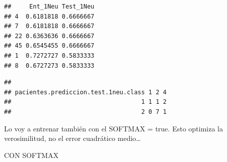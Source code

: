 \documentclass[]{article}
\newenvironment{Shaded}{\begin{snugshade}}{\end{snugshade}}
\newcommand{\CommentTok}[1]{\textcolor[rgb]{0.56,0.35,0.01}{\textit{#1}}}
\newcommand{\DataTypeTok}[1]{\textcolor[rgb]{0.13,0.29,0.53}{#1}}
\newcommand{\FloatTok}[1]{\textcolor[rgb]{0.00,0.00,0.81}{#1}}
\newcommand{\KeywordTok}[1]{\textcolor[rgb]{0.13,0.29,0.53}{\textbf{#1}}}
\newcommand{\NormalTok}[1]{#1}
\newcommand{\OperatorTok}[1]{\textcolor[rgb]{0.81,0.36,0.00}{\textbf{#1}}}
\newcommand{\StringTok}[1]{\textcolor[rgb]{0.31,0.60,0.02}{#1}}
\begin{document}
\begin{Shaded}
\end{Shaded}

\begin{verbatim}
##     Ent_1Neu Test_1Neu
## 4  0.6181818 0.6666667
## 7  0.6181818 0.6666667
## 22 0.6363636 0.6666667
## 45 0.6545455 0.6666667
## 1  0.7272727 0.5833333
## 8  0.6727273 0.5833333
\end{verbatim}

\begin{Shaded}
\end{Shaded}

\begin{verbatim}
##                                     
## pacientes.prediccion.test.1neu.class 1 2 4
##                                    1 1 1 2
##                                    2 0 7 1
\end{verbatim}

Lo voy a entrenar también con el SOFTMAX = true. Esto optimiza la
verosimilitud, no el error cuadrático medio\ldots{}

CON SOFTMAX
\end{document}
